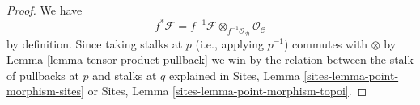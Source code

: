 \documentclass[10pt,a4paper]{amsart}
\theoremstyle{plain}
\theoremstyle{definition}
\theoremstyle{remark}
\numberwithin{equation}{subsection}
\begin{document}
\begin{proof}
We have
$$
f^*\mathcal{F} =
f^{-1}\mathcal{F} \otimes_{f^{-1}\mathcal{O}_\mathcal{D}}
\mathcal{O}_\mathcal{C}
$$
by definition. Since taking stalks at $p$ (i.e., applying
$p^{-1}$) commutes with $\otimes$ by
Lemma \ref{lemma-tensor-product-pullback}
we win by the relation between the stalk of pullbacks at $p$
and stalks at $q$ explained in
Sites, Lemma \ref{sites-lemma-point-morphism-sites} or
Sites, Lemma \ref{sites-lemma-point-morphism-topoi}.
\end{proof}
\end{document}
